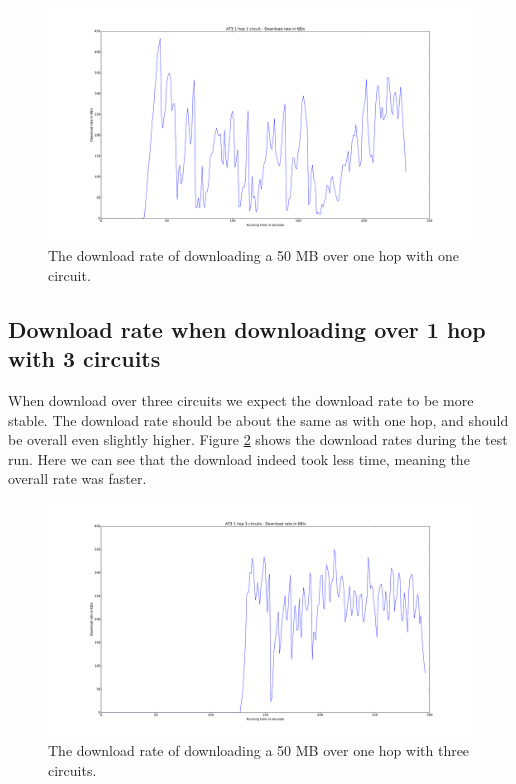 			\begin{figure}[!htb]
				\centering
				\includegraphics[width=\textwidth]{graphics/download_rate_1_hop_1_circuit.pdf}
				\caption{The download rate of downloading a 50 MB over one hop with one circuit.}
				\label{fig:download_rate_1_hop_1_circuit}
			\end{figure}
			
		\subsection{Download rate when downloading over 1 hop with 3 circuits}
			When download over three circuits we expect the download rate to be more stable. The download rate should be about the same as with one hop, and should be overall even slightly higher. Figure \ref{fig:download_rate_1_hop_3_circuits} shows the download rates during the test run. Here we can see that the download indeed took less time, meaning the overall rate was faster.
			
			\begin{figure}[!htb]
				\centering
				\includegraphics[width=\textwidth]{graphics/download_rate_1_hop_3_circuits.pdf}
				\caption{The download rate of downloading a 50 MB over one hop with three circuits.}
				\label{fig:download_rate_1_hop_3_circuits}
			\end{figure}
			
